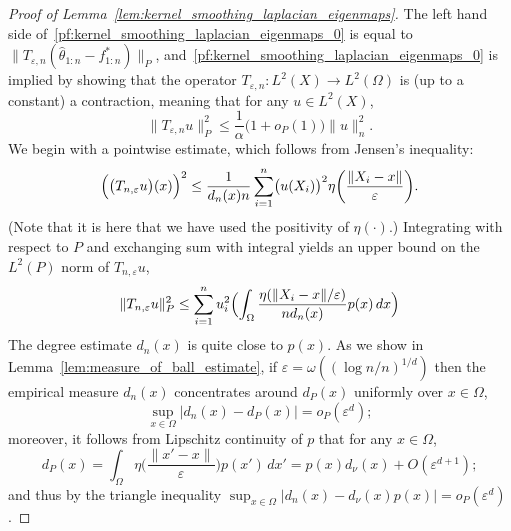 \documentclass{article}
\newcommand{\1}{\mathbf{1}}
\newcommand{\wh}[1]{\widehat{#1}}
\theoremstyle{definition}
\theoremstyle{remark}
\begin{document}
\begin{proof}[Proof of Lemma~\ref{lem:kernel_smoothing_laplacian_eigenmaps}]
	The left hand side of~\eqref{pf:kernel_smoothing_laplacian_eigenmaps_0} is equal to $\|T_{\varepsilon,n}(\wh{\theta}_{1:n} - f^{\ast}_{1:n})\|_P$, and~\eqref{pf:kernel_smoothing_laplacian_eigenmaps_0} is implied by showing that the operator $T_{\varepsilon,n}: L^2(X) \to L^2(\Omega)$ is (up to a constant) a contraction, meaning that for any $u \in L^2(X)$,
	\begin{equation}
	\label{pf:kernel_smoothing_laplacian_eigenmaps_1}
	\|T_{\varepsilon,n}u\|_P^2 \leq \frac{1}{\alpha}\bigl(1 + o_P(1)\bigr) \|u\|_n^2.
	\end{equation}
	We begin with a pointwise estimate, which follows from Jensen's inequality:
	\begin{equation*}
	\Bigl(\bigl(T_{n,\varepsilon}u\bigr)(x)\Bigr)^2 \leq \frac{1}{d_n(x) n} \sum_{i = 1}^{n} \bigl(u(X_i)\bigr)^2 \eta\biggl(\frac{\|X_i - x\|}{\varepsilon}\biggr).
	\end{equation*}
	(Note that it is here that we have used the positivity of $\eta(\cdot)$.) Integrating with respect to $P$ and exchanging sum with integral yields an upper bound on the $L^2(P)$ norm of $T_{n,\varepsilon}u$,
	\begin{equation}
	\label{pf:kernel_smoothing_laplacian_eigenmaps_2}
	\|T_{n,\varepsilon}u\|_P^2 \leq \sum_{i = 1}^{n} u_i^2 \Bigl(\int_{\Omega} \frac{\eta(\|X_i - x\|/\varepsilon)}{n d_n(x)} p(x) \,dx \Bigr)
	\end{equation}
	The degree estimate $d_n(x)$ is quite close to $p(x)$. As we show in Lemma~\ref{lem:measure_of_ball_estimate}, if $\varepsilon = \omega((\log n/n)^{1/d})$ then the empirical measure $d_n(x)$ concentrates around $d_P(x)$ uniformly over $x \in \Omega$, 
	\begin{equation*}
	\sup_{x \in \Omega}|d_n(x) - d_P(x)| = o_P(\varepsilon^d);
	\end{equation*}
	moreover, it follows from Lipschitz continuity of $p$ that for any $x \in \Omega$,
	\begin{equation*}
	d_P(x) = \int_{\Omega} \eta\biggl(\frac{\|x' - x\|}{\varepsilon}\biggr) p(x') \,dx' = p(x) d_{\nu}(x) + O(\varepsilon^{d + 1});
	\end{equation*}
	and thus by the triangle inequality $\sup_{x \in \Omega}|d_n(x) - d_\nu(x) p(x)| = o_P(\varepsilon^d)$.
	

\end{proof}
\end{document}
